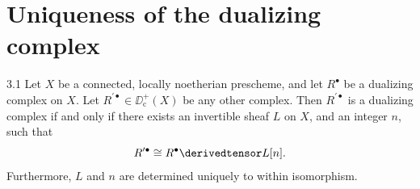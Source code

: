 \par\endgroup

\section{Uniqueness of the dualizing complex}\label{sec:5.3}
\begingroup
\setlength{\emergencystretch}{2em}

\begin{booktheorem}{3.1}\label{thm:5.3.1}
Let $X$ be a connected, locally noetherian prescheme, and let $R^\bullet$ be a dualizing complex on $X$. Let $R^{\prime\bullet}\in\DD_{\mathrm{c}}^+(X)$ be any other complex. Then $R^{\prime\bullet}$ is a dualizing complex if and only if there exists an invertible sheaf $L$ on $X$, and an integer $n$, such that
\[
R^{\prime\bullet}\cong R^\bullet\derivedtensor L[n].
\]
Furthermore, $L$ and $n$ are determined uniquely to within isomorphism.
\end{booktheorem}

